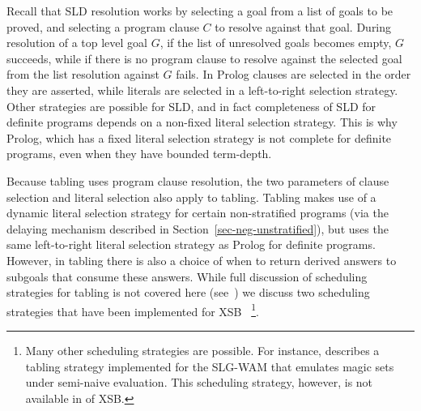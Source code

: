 Recall that SLD resolution works by selecting a goal from a list of
goals to be proved, and selecting a program clause $C$ to resolve
against that goal.  During resolution of a top level goal $G$, if the
list of unresolved goals becomes empty, $G$ succeeds, while if there
is no program clause to resolve against the selected goal from the
list resolution against $G$ fails.  In Prolog clauses are selected in
the order they are asserted, while literals are selected in a
left-to-right selection strategy.  Other strategies are possible for
SLD, and in fact completeness of SLD for definite programs depends on
a non-fixed literal selection strategy.  This is why Prolog, which has
a fixed literal selection strategy is not complete for definite
programs, even when they have bounded term-depth.

Because tabling uses program clause resolution, the two parameters of
clause selection and literal selection also apply to tabling.  Tabling
makes use of a dynamic literal selection strategy for certain
non-stratified programs (via the delaying mechanism described in
Section~\ref{sec-neg-unstratified}), but uses the same left-to-right
literal selection strategy as Prolog for definite programs.  However,
in tabling there is also a choice of when to return derived answers to
subgoals that consume these answers.  While full discussion of
scheduling strategies for tabling is not covered here
(see~\cite{JFLP-Scheduling}) we discuss two scheduling strategies
that have been implemented for XSB \version~\footnote{Many other
  scheduling strategies are possible.  For instance, \cite{FrSW97}
  describes a tabling strategy implemented for the SLG-WAM that
  emulates magic sets under semi-naive evaluation.  This scheduling
  strategy, however, is not available in \version{} of XSB.}.

